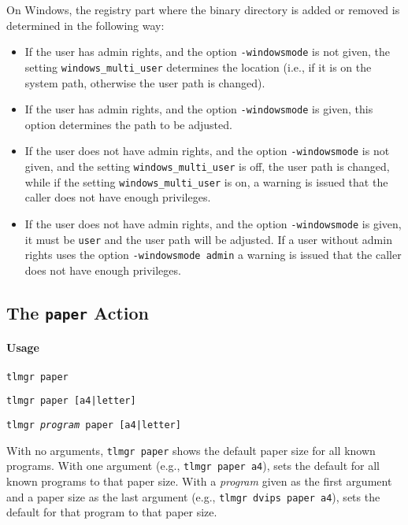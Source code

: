 \documentclass[11pt]{article}
\begin{document}
On Windows, the registry part where the binary directory is
added or removed is determined in the following way:
\begin{itemize}

\item If the user has admin rights, and the option
\texttt{-windowsmode} is not given, the setting
\texttt{windows\_multi\_user} determines the location (i.e.,
if it is on the system path, otherwise the user path is
changed).

\item If the user has admin rights, and the option
\texttt{-windowsmode} is given, this option determines the path
to be adjusted.

\item If the user does not have admin rights, and the
option \texttt{-windowsmode} is not given, and the setting
\texttt{windows\_multi\_user} is off, the user path is changed,
while if the setting \texttt{windows\_multi\_user} is on, a
warning is issued that the caller does not have enough
privileges.

\item If the user does not have admin rights, and the option
\texttt{-windowsmode} is given, it must be \texttt{user} and
the user path will be adjusted. If a user without admin
rights uses the option \texttt{-windowsmode admin} a warning
is issued that the caller does not have enough privileges.
\end{itemize}

\clearpage

\subsection{The {\tt paper} Action}
\label{paper}

\paragraph{Usage}
\begin{list}{}{}
\item \texttt{tlmgr paper} 
\item \texttt{tlmgr paper [a4|letter]} 
\item \texttt{tlmgr \textit{program} paper [a4|letter]} 
\end{list}

With no arguments, \texttt{tlmgr paper} shows the default paper size for all known programs.
With one argument (e.g., \texttt{tlmgr paper a4}), sets the default for all known programs to that
paper size.
With a \textit{program} given as the first argument and a paper size as the last argument 
(e.g., \texttt{tlmgr dvips paper a4}), sets the default for that program to that paper size.
\end{document}
